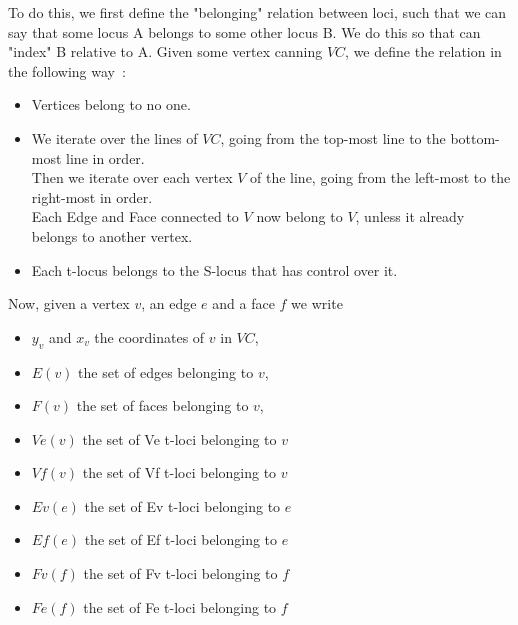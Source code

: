 \documentclass{report}
\begin{document}
To do this, we first define the "belonging" relation between loci, such that we can say that some locus A belongs to some other locus B. We do this so that can "index" B relative to A. Given some vertex canning $VC$, we define the relation in the following way~:
\begin{itemize}
	\item Vertices belong to no one.
	\item We iterate over the lines of $VC$, going from the top-most line to the bottom-most line in order.\\
	Then we iterate over each vertex $V$ of the line, going from the left-most to the right-most in order.\\
	Each Edge and Face connected to $V$ now belong to $V$, unless it already belongs to another vertex.
	\item Each t-locus belongs to the S-locus that has control over it.
\end{itemize}
Now, given a vertex $v$, an edge $e$ and a face $f$ we write
\begin{itemize}[noitemsep, nosep, label=-]
	\item $y_v$ and $x_v$ the coordinates of $v$ in $VC$,
	\item $E(v)$ the set of edges belonging to $v$,
	\item $F(v)$ the set of faces belonging to $v$,
	\item $Ve(v)$ the set of Ve t-loci belonging to $v$
	\item $Vf(v)$ the set of Vf t-loci belonging to $v$
	\item $Ev(e)$ the set of Ev t-loci belonging to $e$
	\item $Ef(e)$ the set of Ef t-loci belonging to $e$
	\item $Fv(f)$ the set of Fv t-loci belonging to $f$
	\item $Fe(f)$ the set of Fe t-loci belonging to $f$\\
\end{itemize}
\end{document}
